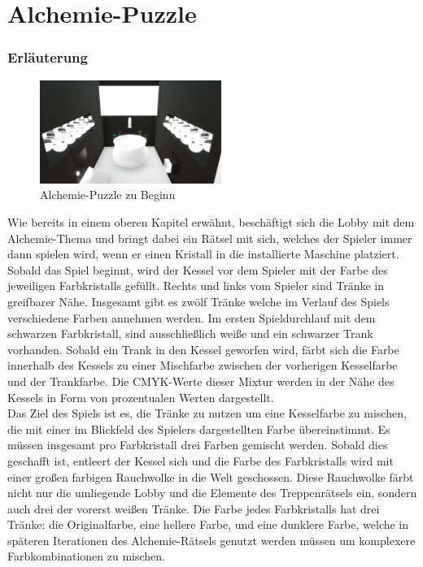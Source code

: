 \newpage

\section{Alchemie-Puzzle}
\subsubsection{Erläuterung}
\begin{figure}
	\vspace*{-0.5cm}
	\includegraphics[width=5.9cm]{Pictures/Alchemie}
	\caption{Alchemie-Puzzle zu Beginn}
	\vspace*{-0.5cm}
	\label{fig:alchemie_start}
\end{figure}
Wie bereits in einem oberen Kapitel erwähnt, beschäftigt sich die Lobby mit dem Alchemie-Thema und bringt dabei ein Rätsel mit sich, welches der Spieler immer dann spielen wird, wenn er einen Kristall in die installierte Maschine platziert. Sobald das Spiel beginnt, wird der Kessel vor dem Spieler mit der Farbe des jeweiligen Farbkristalls gefüllt. Rechts und links vom Spieler sind Tränke in greifbarer Nähe. Insgesamt gibt es zwölf Tränke welche im Verlauf des Spiels verschiedene Farben annehmen werden. Im ersten Spieldurchlauf mit dem schwarzen Farbkristall, sind ausschließlich weiße und ein schwarzer Trank vorhanden. Sobald ein Trank in den Kessel geworfen wird, färbt sich die Farbe innerhalb des Kessels zu einer Mischfarbe zwischen der vorherigen Kesselfarbe und der Trankfarbe. Die CMYK-Werte dieser Mixtur werden in der Nähe des Kessels in Form von prozentualen Werten dargestellt.\\
Das Ziel des Spiels ist es, die Tränke zu nutzen um eine Kesselfarbe zu mischen, die mit einer im Blickfeld des Spielers dargestellten Farbe übereinstimmt. Es müssen insgesamt pro Farbkristall drei Farben gemischt werden. Sobald dies geschafft ist, entleert der Kessel sich und die Farbe des Farbkristalls wird mit einer großen farbigen Rauchwolke in die Welt geschossen. Diese Rauchwolke färbt nicht nur die umliegende Lobby und die Elemente des Treppenrätsels ein, sondern auch drei der vorerst weißen Tränke. Die Farbe jedes Farbkristalls hat drei Tränke: die Originalfarbe, eine hellere Farbe, und eine dunklere Farbe, welche in späteren Iterationen des Alchemie-Rätsels genutzt werden müssen um komplexere Farbkombinationen zu mischen.
